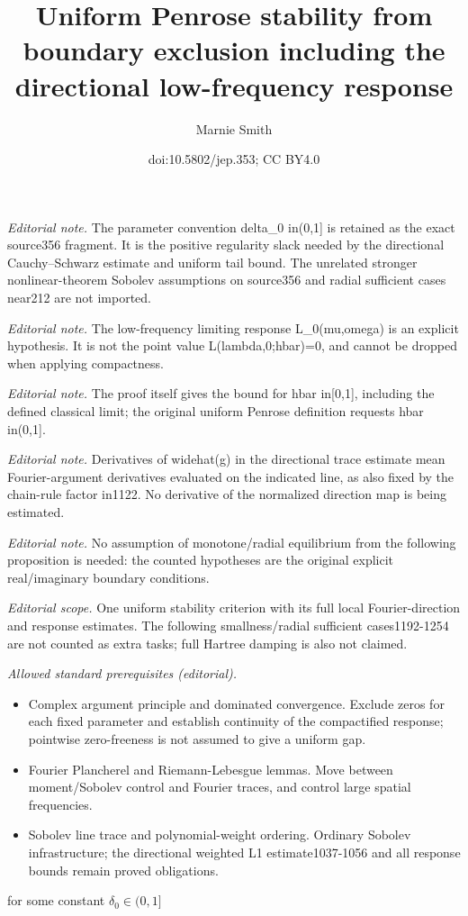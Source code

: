 \documentclass[10pt,a4paper]{article}
\title{Uniform Penrose stability from boundary exclusion including the directional low-frequency response}
\author{Marnie Smith}
\date{doi:10.5802/jep.353; CC BY4.0}
\theoremstyle{plain}
\theoremstyle{remark}
\begin{document}
\maketitle
\noindent\textit{Editorial note.} The parameter convention delta\_0 in(0,1] is retained as the exact source356 fragment. It is the positive regularity slack needed by the directional Cauchy–Schwarz estimate and uniform tail bound. The unrelated stronger nonlinear-theorem Sobolev assumptions on source356 and radial sufficient cases near212 are not imported.\par\medskip
\noindent\textit{Editorial note.} The low-frequency limiting response L\_0(mu,omega) is an explicit hypothesis. It is not the point value L(lambda,0;hbar)=0, and cannot be dropped when applying compactness.\par\medskip
\noindent\textit{Editorial note.} The proof itself gives the bound for hbar in[0,1], including the defined classical limit; the original uniform Penrose definition requests hbar in(0,1].\par\medskip
\noindent\textit{Editorial note.} Derivatives of widehat(g) in the directional trace estimate mean Fourier-argument derivatives evaluated on the indicated line, as also fixed by the chain-rule factor in1122. No derivative of the normalized direction map is being estimated.\par\medskip
\noindent\textit{Editorial note.} No assumption of monotone/radial equilibrium from the following proposition is needed: the counted hypotheses are the original explicit real/imaginary boundary conditions.\par\medskip
\noindent\textit{Editorial scope.} One uniform stability criterion with its full local Fourier-direction and response estimates. The following smallness/radial sufficient cases1192-1254 are not counted as extra tasks; full Hartree damping is also not claimed.\par\medskip
\noindent\textit{Allowed standard prerequisites (editorial).}\begin{itemize}
\item Complex argument principle and dominated convergence. Exclude zeros for each fixed parameter and establish continuity of the compactified response; pointwise zero-freeness is not assumed to give a uniform gap.
\item Fourier Plancherel and Riemann-Lebesgue lemmas. Move between moment/Sobolev control and Fourier traces, and control large spatial frequencies.
\item Sobolev line trace and polynomial-weight ordering. Ordinary Sobolev infrastructure; the directional weighted L1 estimate1037-1056 and all response bounds remain proved obligations.
\end{itemize}\medskip
for some constant $\delta_0\in(0,1]$
\end{document}
